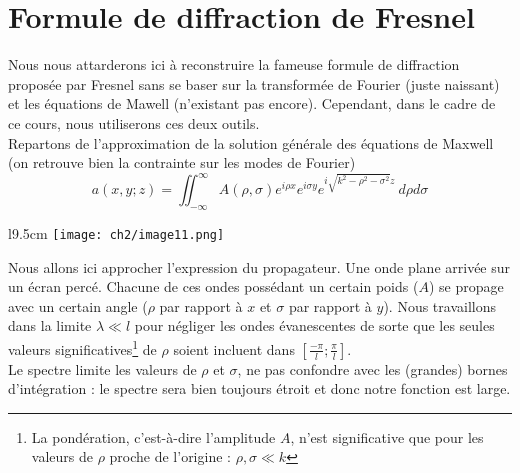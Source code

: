 \newpage
\section{Formule de diffraction de Fresnel}
Nous nous attarderons ici à reconstruire la fameuse formule de diffraction proposée par 
Fresnel sans se baser sur la transformée de Fourier (juste naissant) et les équations 
de Mawell (n'existant pas encore). Cependant, dans le cadre de ce cours, nous utiliserons 
ces deux outils.\\

Repartons de l'approximation de la solution générale des équations de Maxwell (on retrouve 
bien la contrainte sur les modes de Fourier)
\begin{equation}
a(x,y;z) = \iint_{-\infty}^\infty A(\rho,\sigma)e^{i\rho x}e^{i\sigma y} e^{i\sqrt{k^2-\rho^2-
\sigma^2}z}\ d\rho d\sigma
\end{equation}

\begin{wrapfigure}[8]{l}{9.5cm}
\vspace{-4mm}
\texttt{[image: ch2/image11.png]}
\end{wrapfigure}
Nous allons ici approcher l'expression du propagateur. Une onde plane arrivée sur un écran 
percé. Chacune de ces ondes possédant un certain poids ($A$) se propage avec un certain 
angle ($\rho$ par rapport à $x$ et $\sigma$ par rapport à $y$). Nous travaillons dans la 
limite $\lambda \ll l$ pour négliger les ondes évanescentes de sorte que les seules 
valeurs significatives\footnote{La pondération, c'est-à-dire l'amplitude $A$, n'est 
significative que pour les valeurs de $\rho$ proche de l'origine : $\rho,\sigma \ll k$} de 
$\rho$ soient incluent dans $\left[\frac{-\pi}{l};\frac{\pi}{l}\right]$.\\

\danger Le spectre limite les valeurs de $\rho$ et $\sigma$, ne pas confondre avec les 
(grandes) bornes d'intégration : le spectre sera bien toujours étroit et donc notre 
fonction est large.\\

